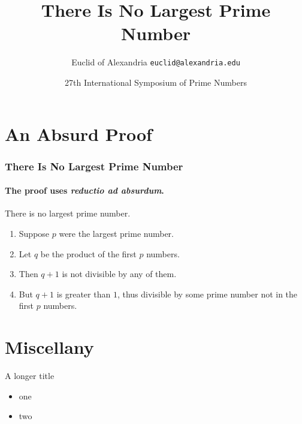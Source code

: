 \documentclass{beamer}
\title{There Is No Largest Prime Number}
\date[ISPN ’80]{27th International Symposium of Prime Numbers}
\author[Euclid]{Euclid of Alexandria \texttt{euclid@alexandria.edu}}
\institute{Library of Alexandria}
\begin{document}
\begin{frame}[plain] %
    \titlepage
\end{frame}

\section{An Absurd Proof}
\begin{frame} 
    \frametitle{There Is No Largest Prime Number} 
    \framesubtitle{The proof uses \textit{reductio ad absurdum}.} 
    \begin{theorem}
        There is no largest prime number.
    \end{theorem} 
    \begin{enumerate} 
        \item<1-| alert@1> Suppose $p$ were the largest prime number. 
        \item<2-> Let $q$ be the product of the first $p$ numbers. 
        \item<3-> Then $q+1$ is not divisible by any of them. 
        \item<1-> But $q + 1$ is greater than $1$, thus divisible by some prime number not
        in the first $p$ numbers.
    \end{enumerate}
\end{frame}

\section{Miscellany}
    \begin{frame}{A longer title}
    \begin{itemize}
        \item one
        \item two
    \end{itemize}
\end{frame}
\end{document}

